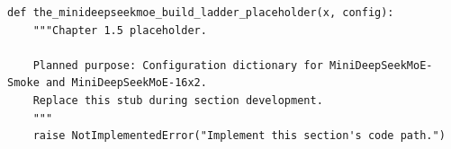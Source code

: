 \begin{lstlisting}[style=bookpython,caption={Planned code placeholder for the MiniDeepSeekMoE build ladder.},label={lst:ch01-the-minideepseekmoe-build-ladder}]
def the_minideepseekmoe_build_ladder_placeholder(x, config):
    """Chapter 1.5 placeholder.

    Planned purpose: Configuration dictionary for MiniDeepSeekMoE-Smoke and MiniDeepSeekMoE-16x2.
    Replace this stub during section development.
    """
    raise NotImplementedError("Implement this section's code path.")
\end{lstlisting}
